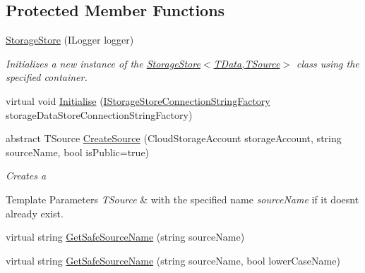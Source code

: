 \subsection*{Protected Member Functions}
\begin{DoxyCompactItemize}
\item 
\hyperlink{classCqrs_1_1Azure_1_1BlobStorage_1_1StorageStore_ae7a725cdcb7de73e097b02c19463bae7_ae7a725cdcb7de73e097b02c19463bae7}{Storage\+Store} (I\+Logger logger)
\begin{DoxyCompactList}\small\item\em Initializes a new instance of the \hyperlink{classCqrs_1_1Azure_1_1BlobStorage_1_1StorageStore_ae7a725cdcb7de73e097b02c19463bae7_ae7a725cdcb7de73e097b02c19463bae7}{Storage\+Store$<$\+T\+Data,\+T\+Source$>$} class using the specified container. \end{DoxyCompactList}\item 
virtual void \hyperlink{classCqrs_1_1Azure_1_1BlobStorage_1_1StorageStore_a8d16603267a768190f2c49ca3d1c439e_a8d16603267a768190f2c49ca3d1c439e}{Initialise} (\hyperlink{interfaceCqrs_1_1Azure_1_1BlobStorage_1_1IStorageStoreConnectionStringFactory}{I\+Storage\+Store\+Connection\+String\+Factory} storage\+Data\+Store\+Connection\+String\+Factory)
\item 
abstract T\+Source \hyperlink{classCqrs_1_1Azure_1_1BlobStorage_1_1StorageStore_a07903b6c3eca8d49878deb6e2e5719e0_a07903b6c3eca8d49878deb6e2e5719e0}{Create\+Source} (Cloud\+Storage\+Account storage\+Account, string source\+Name, bool is\+Public=true)
\begin{DoxyCompactList}\small\item\em Creates a 
\begin{DoxyTemplParams}{Template Parameters}
{\em T\+Source} & with the specified name {\itshape source\+Name}  if it doesn\textquotesingle{}t already exist. \\
\hline
\end{DoxyTemplParams}
\end{DoxyCompactList}\item 
virtual string \hyperlink{classCqrs_1_1Azure_1_1BlobStorage_1_1StorageStore_a3ed119d808d9b29e99b1c6c983831482_a3ed119d808d9b29e99b1c6c983831482}{Get\+Safe\+Source\+Name} (string source\+Name)
\item 
virtual string \hyperlink{classCqrs_1_1Azure_1_1BlobStorage_1_1StorageStore_ad3364a0c84d5ed666615b9528d6f640e_ad3364a0c84d5ed666615b9528d6f640e}{Get\+Safe\+Source\+Name} (string source\+Name, bool lower\+Case\+Name)
\item 

\end{DoxyCompactItemize}

